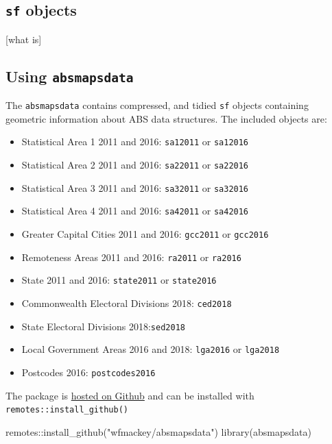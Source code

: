 \documentclass[
]{book}
\newenvironment{Shaded}{\begin{snugshade}}{\end{snugshade}}
\newcommand{\FunctionTok}[1]{\textcolor[rgb]{0.00,0.00,0.00}{#1}}
\newcommand{\NormalTok}[1]{#1}
\newcommand{\SpecialCharTok}[1]{\textcolor[rgb]{0.00,0.00,0.00}{#1}}
\newcommand{\StringTok}[1]{\textcolor[rgb]{0.31,0.60,0.02}{#1}}
\providecommand{\tightlist}{%
  \setlength{\itemsep}{0pt}\setlength{\parskip}{0pt}}
\begin{document}
\hypertarget{sf-objects}{%
\subsection{\texorpdfstring{\texttt{sf} objects}{sf objects}}\label{sf-objects}}

{[}what is{]}

\hypertarget{using-absmapsdata}{%
\subsection{\texorpdfstring{Using \texttt{absmapsdata}}{Using absmapsdata}}\label{using-absmapsdata}}

The \texttt{absmapsdata} contains compressed, and tidied \texttt{sf} objects containing geometric information about ABS data structures. The included objects are:

\begin{itemize}
\tightlist
\item
  Statistical Area 1 2011 and 2016: \texttt{sa12011} or \texttt{sa12016}
\item
  Statistical Area 2 2011 and 2016: \texttt{sa22011} or \texttt{sa22016}
\item
  Statistical Area 3 2011 and 2016: \texttt{sa32011} or \texttt{sa32016}
\item
  Statistical Area 4 2011 and 2016: \texttt{sa42011} or \texttt{sa42016}
\item
  Greater Capital Cities 2011 and 2016: \texttt{gcc2011} or \texttt{gcc2016}
\item
  Remoteness Areas 2011 and 2016: \texttt{ra2011} or \texttt{ra2016}
\item
  State 2011 and 2016: \texttt{state2011} or \texttt{state2016}
\item
  Commonwealth Electoral Divisions 2018: \texttt{ced2018}
\item
  State Electoral Divisions 2018:\texttt{sed2018}
\item
  Local Government Areas 2016 and 2018: \texttt{lga2016} or \texttt{lga2018}
\item
  Postcodes 2016: \texttt{postcodes2016}
\end{itemize}

The package is \href{https://github.com/wfmackey/absmapsdata}{hosted on Github} and can be installed with \texttt{remotes::install\_github()}

\begin{Shaded}
\begin{Highlighting}[]
\NormalTok{remotes}\SpecialCharTok{::}\FunctionTok{install\_github}\NormalTok{(}\StringTok{"wfmackey/absmapsdata"}\NormalTok{)}
\FunctionTok{library}\NormalTok{(absmapsdata)}
\end{Highlighting}
\end{Shaded}
\end{document}
